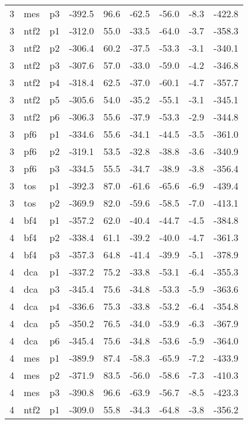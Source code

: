 \documentclass[a4paper]{article}
\begin{document}
\begin{table}[ht]
\begin{tabular}{rllrrrrrr}
   3 & mes & p3 & -392.5 & 96.6 & -62.5 & -56.0 & -8.3 & -422.8 \\ 
   3 & ntf2 & p1 & -312.0 & 55.0 & -33.5 & -64.0 & -3.7 & -358.3 \\ 
   3 & ntf2 & p2 & -306.4 & 60.2 & -37.5 & -53.3 & -3.1 & -340.1 \\ 
   3 & ntf2 & p3 & -307.6 & 57.0 & -33.0 & -59.0 & -4.2 & -346.8 \\ 
   3 & ntf2 & p4 & -318.4 & 62.5 & -37.0 & -60.1 & -4.7 & -357.7 \\ 
   3 & ntf2 & p5 & -305.6 & 54.0 & -35.2 & -55.1 & -3.1 & -345.1 \\ 
   3 & ntf2 & p6 & -306.3 & 55.6 & -37.9 & -53.3 & -2.9 & -344.8 \\ 
   3 & pf6 & p1 & -334.6 & 55.6 & -34.1 & -44.5 & -3.5 & -361.0 \\ 
   3 & pf6 & p2 & -319.1 & 53.5 & -32.8 & -38.8 & -3.6 & -340.9 \\ 
   3 & pf6 & p3 & -334.5 & 55.5 & -34.7 & -38.9 & -3.8 & -356.4 \\ 
   3 & tos & p1 & -392.3 & 87.0 & -61.6 & -65.6 & -6.9 & -439.4 \\ 
   3 & tos & p2 & -369.9 & 82.0 & -59.6 & -58.5 & -7.0 & -413.1 \\ 
   4 & bf4 & p1 & -357.2 & 62.0 & -40.4 & -44.7 & -4.5 & -384.8 \\ 
   4 & bf4 & p2 & -338.4 & 61.1 & -39.2 & -40.0 & -4.7 & -361.3 \\ 
   4 & bf4 & p3 & -357.3 & 64.8 & -41.4 & -39.9 & -5.1 & -378.9 \\ 
   4 & dca & p1 & -337.2 & 75.2 & -33.8 & -53.1 & -6.4 & -355.3 \\ 
   4 & dca & p3 & -345.4 & 75.6 & -34.8 & -53.3 & -5.9 & -363.6 \\ 
   4 & dca & p4 & -336.6 & 75.3 & -33.8 & -53.2 & -6.4 & -354.8 \\ 
   4 & dca & p5 & -350.2 & 76.5 & -34.0 & -53.9 & -6.3 & -367.9 \\ 
   4 & dca & p6 & -345.4 & 75.6 & -34.8 & -53.6 & -5.9 & -364.0 \\ 
   4 & mes & p1 & -389.9 & 87.4 & -58.3 & -65.9 & -7.2 & -433.9 \\ 
   4 & mes & p2 & -371.9 & 83.5 & -56.0 & -58.6 & -7.3 & -410.3 \\ 
   4 & mes & p3 & -390.8 & 96.6 & -63.9 & -56.7 & -8.5 & -423.3 \\ 
   4 & ntf2 & p1 & -309.0 & 55.8 & -34.3 & -64.8 & -3.8 & -356.2 \\ 

\end{tabular}
\end{table}
\end{document}
